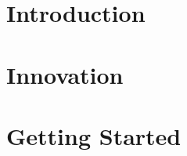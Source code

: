 \documentclass{report}
\begin{document}


\tableofcontents

\chapter{Introduction}\label{ch:intro}


\chapter{Innovation}\label{ch:innovation}


\chapter{Getting Started}\label{ch:getting-started}


\printnoidxglossaries{}



\end{document}
